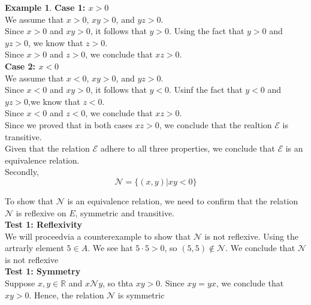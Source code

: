 \documentclass{book}
\theoremstyle{definition}
\newtheorem{example}{Example}[definition]
\theoremstyle{remark}
\newcommand{\bb}[1]{\mathbb{#1}}
\newcommand{\cc}[1]{\mathcal{#1}}
\newcommand{\m}{\cdot}
\begin{document}
\begin{example}
                \textbf{Case 1: $x>0$} \\
                    We assume that $x>0$, $xy > 0$, and $yz >0$. \\
                    Since $x >0 $ and $xy > 0$, it follows that $y>0$. Using the fact that $y>0$ and $yz > 0$, we know that $z > 0$. \\
                    Since $x > 0$ and $z > 0$, we conclude that $xz > 0$. \\
                
                \textbf{Case 2: $x<0$} \\
                    We assume that $x < 0$, $xy > 0$, and $yz >0$. \\
                    Since $x < 0 $ and $xy > 0$, it follows that $y < 0$. Usinf the fact that $y < 0$ and $yz > 0$,we know that $z < 0$. \\
                    Since $x < 0$ and $z < 0$, we conclude that $xz > 0$. \\
                
                Since we proved that in both cases $xz > 0$, we conclude that the realtion $\cc{E}$ is transitive. \\
                
            Given that the relation $\cc{E}$ adhere to all three properties, we conclude that $\cc{E}$ is an equivalence relation. \\
            
            
        Secondly, \\
            \begin{equation*}
                \cc{N} = \{ (x,y) | xy < 0 \}
            \end{equation*}
            
        To show that $\cc{N}$ is an equivalence relation, we need to confirm that the relation $\cc{N}$ is reflexive on $E$, symmetric and transitive. \\
        
            \textbf{Test 1: Reflexivity } \\
                We will proceedvia a counterexample to show that $\cc{N}$ is not reflexive. Using the artrarly element $5 \in A$. We see hat $5 \m 5 > 0$, so $(5,5) \notin \cc{N}$. We conclude that $\cc{N}$ is not reflexive  \\

            \textbf{Test 1: Symmetry } \\
                Suppose $x,y \in \bb{R}$ and $x \cc{N} y$, so thta $xy >0$. Since $xy = yx$, we conclude that $xy > 0$. Hence, the relation $\cc{N}$ is symmetric \\
            

\end{example}
\end{document}
